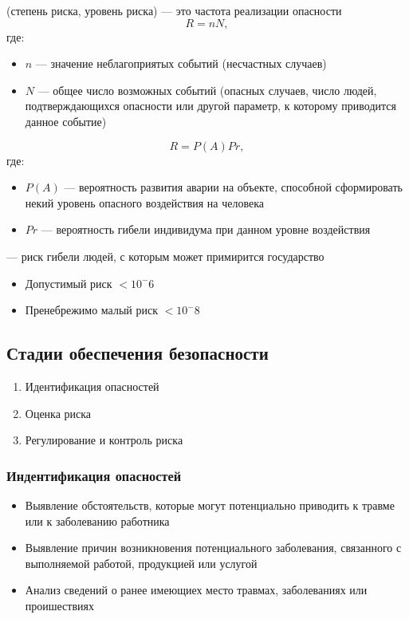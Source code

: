 \documentclass[a4paper, 14pt]{extarticle}
\begin{document}
 (степень риска, уровень риска) --- это частота реализации опасности
\begin{equation}
    R = nN,
\end{equation}
где:
\begin{itemize}
    \item $n$ --- значение неблагоприятых событий (несчастных случаев)
    \item $N$ --- общее число возможных событий (опасных случаев, число людей, подтверждающихся опасности или другой параметр, к которому приводится данное событие)
\end{itemize}
\begin{equation}
    R = P(A) Pr, %
\end{equation}
где:
\begin{itemize}
    \item $P(A)$ --- вероятность развития аварии на объекте, способной сформировать некий уровень опасного воздействия на человека
    \item $Pr$ --- вероятность гибели индивидума при данном уровне воздействия %
\end{itemize}
 --- риск гибели людей, с которым может примирится государство
\begin{itemize}
    \item Допустимый риск $<10^-6$
    \item Пренебрежимо малый риск $<10^-8$
\end{itemize}

\subsection{Стадии обеспечения безопасности}
\begin{enumerate}
    \item Идентификация опасностей
    \item Оценка риска
    \item Регулирование и контроль риска
\end{enumerate}

\subsubsection{Индентификация опасностей}
\begin{itemize}
    \item Выявление обстоятельств, которые могут потенциально приводить к травме или к заболеванию работника
    \item Выявление причин возникновения потенциального заболевания, связанного с выполняемой работой, продукцией или услугой
    \item Анализ сведений о ранее имеющиех место травмах, заболеваниях или проишествиях
\end{itemize}
\end{document}
